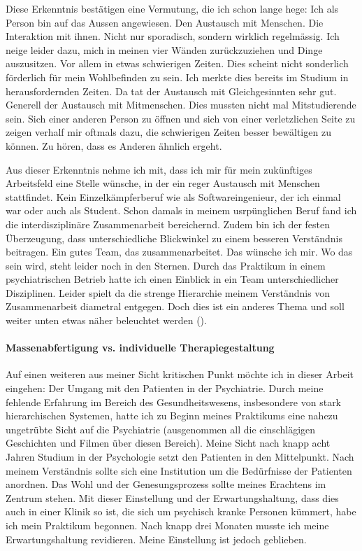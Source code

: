 \documentclass[jou,apacite]{apa6}
\begin{document}
Diese Erkenntnis bestätigen eine Vermutung, die ich schon lange hege: Ich als Person bin auf das Aussen angewiesen. Den Austausch mit Menschen. Die Interaktion mit ihnen. Nicht nur sporadisch, sondern wirklich regelmässig. Ich neige leider dazu, mich in meinen vier Wänden zurückzuziehen und Dinge auszusitzen. Vor allem in etwas schwierigen Zeiten. Dies scheint nicht sonderlich förderlich für mein Wohlbefinden zu sein. Ich merkte dies bereits im Studium in herausfordernden Zeiten. Da tat der Austausch mit Gleichgesinnten sehr gut. Generell der Austausch mit Mitmenschen. Dies mussten nicht mal Mitstudierende sein. Sich einer anderen Person zu öffnen und sich von einer verletzlichen Seite zu zeigen verhalf mir oftmals dazu, die schwierigen Zeiten besser bewältigen zu können. Zu hören, dass es Anderen ähnlich ergeht. 

Aus dieser Erkenntnis nehme ich mit, dass ich mir für mein zukünftiges Arbeitsfeld eine Stelle wünsche, in der ein reger Austausch mit Menschen stattfindet. Kein Einzelkämpferberuf wie als Softwareingenieur, der ich einmal war oder auch als Student. Schon damals in meinem usrpünglichen Beruf fand ich die interdisziplinäre Zusammenarbeit bereichernd. Zudem bin ich der festen Überzeugung, dass unterschiedliche Blickwinkel zu einem besseren Verständnis beitragen. Ein gutes Team, das zusammenarbeitet. Das wünsche ich mir. Wo das sein wird, steht leider noch in den Sternen. Durch das Praktikum in einem psychiatrischen Betrieb hatte ich einen Einblick in ein Team unterschiedlicher Disziplinen. Leider spielt da die strenge Hierarchie meinem Verständnis von Zusammenarbeit diametral entgegen. Doch dies ist ein anderes Thema und soll weiter unten etwas näher beleuchtet werden ().

\paragraph{Massenabfertigung vs. individuelle Therapiegestaltung}
Auf einen weiteren aus meiner Sicht kritischen Punkt möchte ich in dieser Arbeit eingehen: Der Umgang mit den Patienten in der Psychiatrie. Durch meine fehlende Erfahrung im Bereich des Gesundheitswesens, insbesondere von stark hierarchischen Systemen, hatte ich zu Beginn meines Praktikums eine nahezu ungetrübte Sicht auf die Psychiatrie (ausgenommen all die einschlägigen Geschichten und Filmen über diesen Bereich). Meine Sicht nach knapp acht Jahren Studium in der Psychologie setzt den Patienten in den Mittelpunkt. Nach meinem Verständnis sollte sich eine Institution um die Bedürfnisse der Patienten anordnen. Das Wohl und der Genesungsprozess sollte meines Erachtens im Zentrum stehen. Mit dieser Einstellung und der Erwartungshaltung, dass dies auch in einer Klinik so ist, die sich um psychisch kranke Personen kümmert, habe ich mein Praktikum begonnen. Nach knapp drei Monaten musste ich meine Erwartungshaltung revidieren. Meine Einstellung ist jedoch geblieben. 
\end{document}
